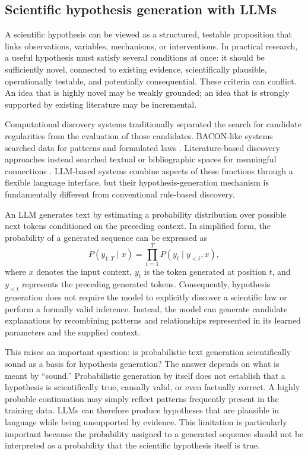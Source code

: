 \documentclass[11pt]{article}
\begin{document}
\subsection{Scientific hypothesis generation with LLMs}
\label{subsec:hypothesis-generation}

A scientific hypothesis can be viewed as a structured, testable proposition that links observations,
variables, mechanisms, or interventions. In practical research, a useful hypothesis must satisfy
several conditions at once: it should be sufficiently novel, connected to existing evidence,
scientifically plausible, operationally testable, and potentially consequential. These criteria can
conflict. An idea that is highly novel may be weakly grounded; an idea that is strongly supported by
existing literature may be incremental.

Computational discovery systems traditionally separated the search for candidate regularities from
the evaluation of those candidates. BACON-like systems searched data for patterns and formulated
laws \cite{langley1987scientific}. Literature-based discovery approaches instead searched textual or
bibliographic spaces for meaningful connections \cite{swanson1986undiscovered}. LLM-based
systems combine aspects of these functions through a flexible language interface, but their
hypothesis-generation mechanism is fundamentally different from conventional rule-based
discovery.

An LLM generates text by estimating a probability distribution over possible next tokens
conditioned on the preceding context. In simplified form, the probability of a generated sequence
can be expressed as
\begin{equation}
P(y_{1:T}\mid x)=\prod_{t=1}^{T}P(y_t\mid y_{<t},x),
\end{equation}
where $x$ denotes the input context, $y_t$ is the token generated at position $t$, and
$y_{<t}$ represents the preceding generated tokens. Consequently, hypothesis generation does not
require the model to explicitly discover a scientific law or perform a formally valid inference.
Instead, the model can generate candidate explanations by recombining patterns and relationships
represented in its learned parameters and the supplied context.

This raises an important question: is probabilistic text generation scientifically sound as a basis
for hypothesis generation? The answer depends on what is meant by ``sound.'' Probabilistic
generation by itself does not establish that a hypothesis is scientifically true, causally valid, or
even factually correct. A highly probable continuation may simply reflect patterns frequently
present in the training data. LLMs can therefore produce hypotheses that are plausible in language
while being unsupported by evidence. This limitation is particularly important because the
probability assigned to a generated sequence should not be interpreted as a probability that the
scientific hypothesis itself is true.
\end{document}
